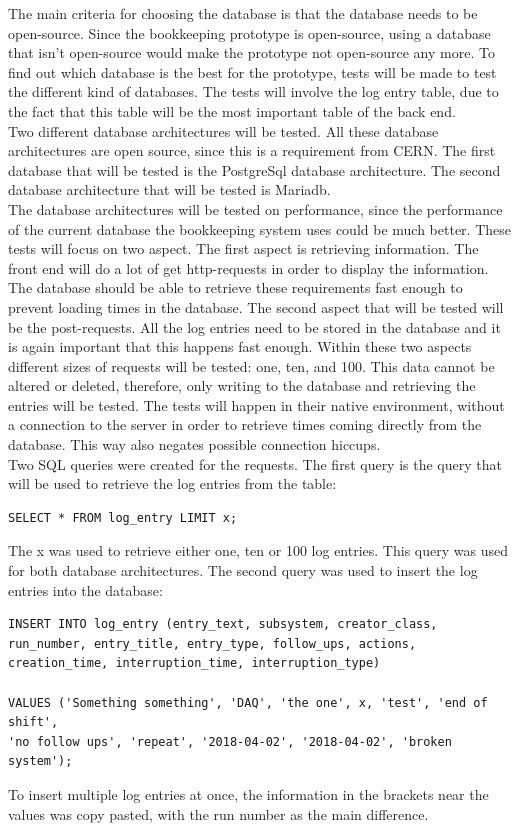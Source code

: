 \documentclass[paper=a4, fontsize=11pt,twoside]{scrartcl}	%
\begin{document}
The main criteria for choosing the database is that the database needs to be open-source. Since the bookkeeping prototype is open-source, using a database that isn't open-source would make the prototype not open-source any more. To find out which database is the best for the prototype, tests will be made to test the different kind of databases. The tests will involve the log entry table, due to the fact that this table will be the most important table of the  back end. \\
Two different database architectures will be tested. All these database architectures are open source, since this is a requirement from CERN. The first database that will be tested is the PostgreSql database architecture. The second database architecture that will be tested is Mariadb. \\
The database architectures will be tested on performance, since the performance of the current database the bookkeeping system uses could be much better. These tests will focus on two aspect. The first aspect is retrieving information. The front end will do a lot of get http-requests in order to display the information. The database should be able to retrieve these requirements fast enough to prevent loading times in the database. The second aspect that will be tested will be the post-requests. All the log entries need to be stored in the database and it is again important that this happens fast enough. Within these two aspects different sizes of requests will be tested: one, ten, and 100. This data cannot be altered or deleted, therefore, only writing to the database and retrieving the entries will be tested. The tests will happen in their native environment, without a connection to the server in order to retrieve times coming directly from the database. This way also negates possible connection hiccups.  \\
Two SQL queries were created for the requests. The first query is the query that will be used to retrieve the log entries from the table:
\begin{lstlisting}
SELECT * FROM log_entry LIMIT x;
\end{lstlisting} 
The x was used to retrieve either one, ten or 100 log entries. This query was used for both database architectures. The second query was used to insert the log entries into the database: \\

\begin{lstlisting}
INSERT INTO log_entry (entry_text, subsystem, creator_class, 
run_number, entry_title, entry_type, follow_ups, actions, 
creation_time, interruption_time, interruption_type)

VALUES ('Something something', 'DAQ', 'the one', x, 'test', 'end of shift',
'no follow ups', 'repeat', '2018-04-02', '2018-04-02', 'broken system');
\end{lstlisting}
To insert multiple log entries at once, the information in the brackets near the values was copy pasted, with the run number as the main difference.
\end{document}
